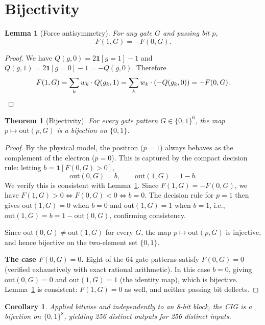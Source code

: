 \documentclass[10pt,a4paper]{article}
\newtheorem{theorem}{Theorem}
\newtheorem{lemma}{Lemma}
\newtheorem{corollary}{Corollary}
\begin{document}
\section{Bijectivity}

\begin{lemma}[Force antisymmetry]
\label{lem:antisym}
For any gate $G$ and passing bit $p$,
\[
  F(1, G) = -F(0, G).
\]
\end{lemma}

\begin{proof}
We have $Q(g, 0) = 2\mathbf{1}[g=1]-1$ and $Q(g, 1) = 2\mathbf{1}[g=0]-1 = -Q(g,0)$.
Therefore
\[
  F(1, G) = \sum_k w_k \cdot Q(g_k, 1) = \sum_k w_k \cdot (-Q(g_k, 0)) = -F(0,G). \qedhere
\]
\end{proof}

\begin{theorem}[Bijectivity]
\label{thm:bij}
For every gate pattern $G \in \{0,1\}^6$, the map $p \mapsto \mathrm{out}(p, G)$
is a bijection on $\{0,1\}$.
\end{theorem}

\begin{proof}
By the physical model, the positron ($p=1$) always behaves as the complement
of the electron ($p=0$). This is captured by the compact decision rule:
letting $b = \mathbf{1}[F(0,G) > 0]$,
\[
  \mathrm{out}(0,G) = b, \qquad \mathrm{out}(1,G) = 1 - b.
\]
We verify this is consistent with Lemma~\ref{lem:antisym}.
Since $F(1,G) = -F(0,G)$, we have $F(1,G) > 0 \iff F(0,G) < 0 \iff b = 0$.
The decision rule for $p=1$ then gives $\mathrm{out}(1,G) = 0$ when $b=0$
and $\mathrm{out}(1,G) = 1$ when $b=1$, i.e., $\mathrm{out}(1,G) = b = 1 - \mathrm{out}(0,G)$,
confirming consistency.

Since $\mathrm{out}(0,G) \neq \mathrm{out}(1,G)$ for every $G$, the map
$p \mapsto \mathrm{out}(p,G)$ is injective, and hence bijective on the
two-element set $\{0,1\}$.

\textbf{The case $F(0,G) = 0$.}
Eight of the 64 gate patterns satisfy $F(0,G)=0$ (verified exhaustively with
exact rational arithmetic). In this case $b=0$, giving
$\mathrm{out}(0,G)=0$ and $\mathrm{out}(1,G)=1$ (the identity map),
which is bijective. Lemma~\ref{lem:antisym} is consistent: $F(1,G)=0$ as well,
and neither passing bit deflects.
\end{proof}

\begin{corollary}
Applied bitwise and independently to an 8-bit block, the CIG
is a bijection on $\{0,1\}^8$, yielding 256 distinct outputs for 256 distinct inputs.
\end{corollary}
\end{document}
